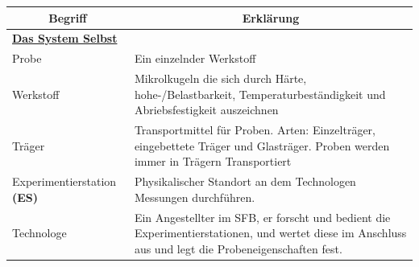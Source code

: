 \documentclass[enabledeprecatedfontcommands,fontsize=12pt,paper=a4,twoside]{scrartcl}
\begin{document}
\begin{longtable}[c]{|p{7cm}|p{8cm}|}
\hline
\multicolumn{1}{|c|}{\textbf{Begriff}}                          & \multicolumn{1}{c|}{\textbf{Erklärung}}                                                                                                                                                                                                               \\ \hline
\endhead
%
\multicolumn{2}{|l|}{{\ul \textbf{Das System Selbst}}}                                                                                                                                                                                                                                                                  \\ \hline
Probe                                                           & Ein einzelnder Werkstoff                                                                                                                                                                                                                              \\ \hline
Werkstoff                                                       & Mikrolkugeln die sich durch Härte, hohe-/Belastbarkeit, Temperaturbeständigkeit und Abriebsfestigkeit auszeichnen                                                                                                                                     \\ \hline
Träger                                                          & Transportmittel für Proben. Arten: Einzelträger, eingebettete Träger und Glasträger. Proben werden immer in Trägern Transportiert                                                                                                                     \\ \hline
Experimentierstation \textbf{(ES)}             & Physikalischer Standort an dem Technologen Messungen durchführen.                                                                                                                                                                                     \\ \hline
Technologe                                                      & Ein Angestellter im SFB, er forscht und bedient die Experimentierstationen, und wertet diese im Anschluss aus und legt die Probeneigenschaften fest.                                                                                                  \\ \hline

\end{longtable}
\end{document}
